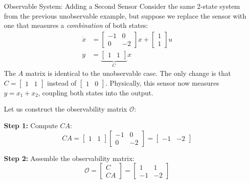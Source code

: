 \begin{examplebox}{Observable System: Adding a Second Sensor}
Consider the same 2-state system from the previous unobservable example, but suppose we replace the sensor with one that measures a \textit{combination} of both states:
\begin{align*}
	\dot{x} &= \begin{bmatrix} -1 & 0 \\ 0 & -2 \end{bmatrix} x + \begin{bmatrix} 1 \\ 1 \end{bmatrix} u \\
	y &= \underbrace{\begin{bmatrix} 1 & 1 \end{bmatrix}}_{C} x
\end{align*}
The $A$ matrix is identical to the unobservable case. The only change is that $C = \begin{bmatrix} 1 & 1 \end{bmatrix}$ instead of $\begin{bmatrix} 1 & 0 \end{bmatrix}$. Physically, this sensor now measures $y = x_1 + x_2$, coupling both states into the output.

Let us construct the observability matrix $\mathcal{O}$:

\textbf{Step 1:} Compute $CA$:
\begin{equation*}
	CA = \begin{bmatrix} 1 & 1 \end{bmatrix}
	\begin{bmatrix} -1 & 0 \\ 0 & -2 \end{bmatrix}
	= \begin{bmatrix} -1 & -2 \end{bmatrix}
\end{equation*}

\textbf{Step 2:} Assemble the observability matrix:
\begin{equation*}
	\mathcal{O} = \begin{bmatrix} C \\ CA \end{bmatrix}
	= \begin{bmatrix} 1 & 1 \\ -1 & -2 \end{bmatrix}
\end{equation*}


\end{examplebox}
